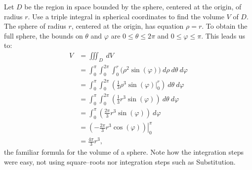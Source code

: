 {Let $D$ be the region in space bounded by the sphere, centered at the origin, of radius $r$. Use a triple integral in spherical coordinates to find the volume $V$ of $D$.
}
{The sphere of radius $r$, centered at the origin, has equation $\rho = r$. To obtain the full sphere, the bounds on $\theta$ and $\varphi$ are $0\leq \theta \leq 2\pi$ and $0 \leq \varphi \leq \pi$. This leads us to:
\begin{align*}
V &= \iiint_D\ dV\\
	&= \int_0^{\pi}\int_0^{2\pi}\int_0^r\big(\rho^2\sin(\varphi)\big)\ d\rho\ d\theta\ d\varphi\\
	&= \int_0^\pi\int_0^{2\pi}\left(\frac13\rho^3\sin(\varphi)\Big|_0^r\right)\ d\theta\ d\varphi\\
	&= \int_0^\pi\int_0^{2\pi} \left(\frac13r^3\sin(\varphi)\right)\ d\theta\ d\varphi\\
	&= \int_0^\pi \left(\frac{2\pi}3r^3\sin(\varphi)\right)\ d\varphi\\
	&= \left.\left(-\frac{2\pi}3r^3\cos(\varphi)\right)\right|_0^{\pi}\\
	&= \frac{4\pi}3r^3,
\end{align*}
the familiar formula for the volume of a sphere. Note how the integration steps were easy, not using square--roots nor integration steps such as Substitution.
}\\


